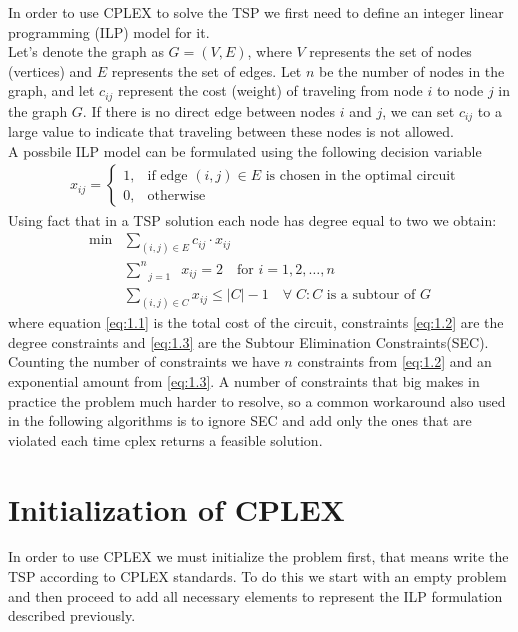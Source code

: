 In order to use CPLEX to solve the TSP we first need to define an integer linear programming (ILP) model for it. \\
Let's denote the graph as $G=(V,E)$, where $V$ represents the set of nodes (vertices) and $E$ represents the set of edges.
Let $n$ be the number of nodes in the graph, and let $c_{ij}$ represent the cost (weight) of traveling from node $i$ to node $j$ in the graph $G$. If there is no direct edge between nodes $i$ and $j$, we can set $c_{ij}$ to a large value to indicate that traveling between these nodes is not allowed. \\
A possbile ILP model can be formulated using the following decision variable
\begin{align*}
	& x_{ij} = 
	\begin{cases}
		1, & \text{if edge } (i,j)\in E \text{ is chosen in the optimal circuit}\\
		0, & \text{otherwise}
	\end{cases}
\end{align*}
Using fact that in a TSP solution each node has degree equal to two we obtain:
\begin{align}
	\text{min} &\sum\limits_{(i,j)\in E} c_{ij} \cdot x_{ij} \tag{1.1}\label{eq:1.1} \\
	&\sum\limits_{\:\;\;j=1\:\;\;}^{n} x_{ij} = 2 \quad \text{for } i = 1,2,\ldots,n \tag{1.2}\label{eq:1.2} \\
	&\sum\limits_{(i,j)\in C} x_{ij} \leq |C| - 1 \quad \forall \; C: C \text{ is a subtour of } G \tag{1.3}\label{eq:1.3}
\end{align}
where equation \eqref{eq:1.1} is the total cost of the circuit, constraints \eqref{eq:1.2} are the degree constraints and \eqref{eq:1.3} are the Subtour Elimination Constraints(SEC). Counting the number of constraints we have $n$ constraints from \eqref{eq:1.2} and an exponential amount from \eqref{eq:1.3}. A number of constraints that big makes in practice the problem much harder to resolve, so a common workaround also used in the following algorithms is to ignore SEC and add only the ones that are violated each time cplex returns a feasible solution.

\section{Initialization of CPLEX}

In order to use CPLEX we must initialize the problem first, that means write the TSP according to CPLEX standards. To do this we start with an empty problem and then proceed to add all necessary elements to represent the ILP formulation described previously.

